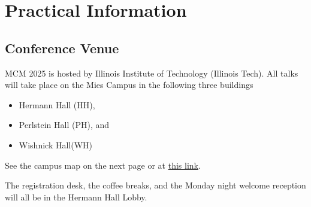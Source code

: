 


\chapter{Practical Information}



\section{Conference Venue}
MCM 2025 is hosted by Illinois Institute of Technology (Illinois Tech).  All talks will take place on the Mies Campus in the following three buildings
\begin{itemize}
	\item Hermann Hall (HH),
	\item Perlstein Hall (PH), and
	\item Wishnick Hall(WH)
\end{itemize}
See the campus map on the next page or at \href{https://www.iit.edu/sites/default/files/2022-08/mies-campus-accessibility-map-2022.pdf}{this link}.  

The registration desk, the coffee breaks, and the Monday night welcome reception will all be  in the Hermann Hall Lobby.

\clearpage

